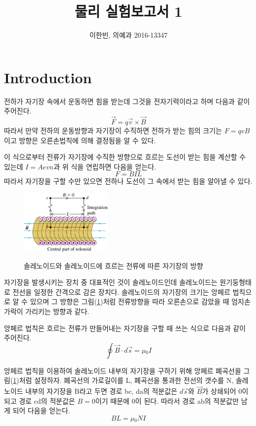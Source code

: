 \documentclass[a4paper]{article}
\title{물리 실험보고서 1}
\author{이한빈, 의예과 2016-13347}
\begin{document}
\maketitle

\section{Introduction}
	전하가 자기장 속에서 운동하면 힘을 받는데 그것을 전자기력이라고 하며 다음과 같이 주어진다.
	\begin{equation}
		\vec{F} = q\vec{v} \times \vec{B}
	\end{equation}
	따라서 만약 전하의 운동방향과 자기장이 수직하면 전하가 받는 힘의 크기는 $F=qvB$이고 방향은 오른손법칙에 의해 결정됨을 알 수 있다.

	이 식으로부터 전류가 자기장에 수직한 방향으로 흐르는 도선이 받는 힘을 계산할 수 있는데 $I=Aevn$과 위 식을 연립하면 다음을 얻는다.
	\begin{equation}
		F = BIL
		\label{eq:current}
	\end{equation}
	따라서 자기장을 구할 수만 있으면 전하나 도선이 그 속에서 받는 힘을 알아낼 수 있다.
	
	\begin{figure}[h]
		\centering
		\includegraphics[width=0.4\textwidth]{img/solenoid.png}
		\label{fig:solenoid}
		\caption{솔레노이드와 솔레노이드에 흐르는 전류에 따른 자기장의 방향}
	\end{figure}
	자기장을 발생시키는 장치 중 대표적인 것이 솔레노이드인데 솔레노이드는 원기둥형태로 전선을 일정한 간격으로 감은 장치다.
	솔레노이드의 자기장의 크기는 앙페르 법칙으로 알 수 있으며 그 방향은 그림(\ref{fig:solenoid})처럼 전류방향을 따라 오른손으로 감았을 때 엄지손가락이 가리키는 방향과 같다.

	앙페르 법칙은 흐르는 전류가 만들어내는 자기장을 구할 때 쓰는 식으로 다음과 같이 주어진다.
	\begin{equation}
		\oint \vec{B} \cdot d\vec{s} = \mu{}_{0}I
	\end{equation}

	앙페르 법칙을 이용하여 솔레노이드 내부의 자기장을 구하기 위해 앙페르 폐곡선을 그림(\ref{fig:solenoid})처럼 설정하자.
	폐곡선의 가로길이를 L, 폐곡선을 통과한 전선의 갯수를 N, 솔레노이드 내부의 자기장을 B라고 두면 경로 bc, da의 적분값은 $d\vec{s}$와 $\vec{B}$가 상쇄되어 0이 되고 경로 cd의 적분값은 $B=0$이기 때문에 0이 된다.
	따라서 경로 ab의 적분값만 남게 되어 다음을 얻는다.
	\begin{equation}
		BL = \mu{}_{0}NI
		\label{eq:prosol}
	\end{equation}
\end{document}
